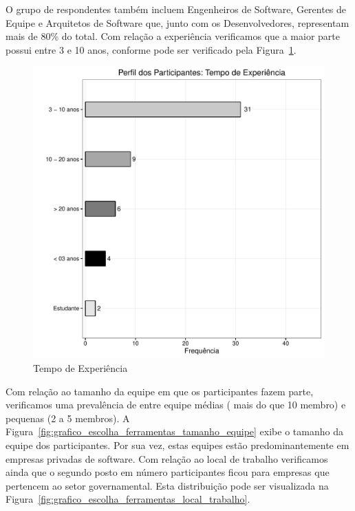 O grupo de respondentes também incluem Engenheiros de Software, Gerentes de
Equipe e Arquitetos de Software que, junto com os Desenvolvedores, representam
mais de 80\% do total. Com relação a experiência verificamos que a maior parte
possui entre 3 e 10 anos, conforme pode ser verificado pela
Figura~\ref{fig:grafico_escolha_ferramentas_tempo_experiencia}.

\begin{figure}[htpb]
	\centering
	\includegraphics[width=0.8\linewidth]{./chapter-caracterizacao-ferramentas/img/grafico_escolha_ferramentas_tempo_experiencia.pdf}
	\caption{Tempo de Experiência}
	\label{fig:grafico_escolha_ferramentas_tempo_experiencia}
\end{figure}

Com relação ao tamanho da equipe em que os participantes fazem parte,
verificamos uma prevalência de entre equipe médias ( mais do que 10 membro) e
pequenas (2 a 5 membros). A
Figura~\ref{fig:grafico_escolha_ferramentas_tamanho_equipe} exibe o tamanho da
equipe dos participantes. Por sua vez, estas equipes estão predominantemente em
empresas privadas de software. Com relação ao local de trabalho verificamos
ainda que o segundo posto em número participantes ficou para empresas que
pertencem ao setor governamental. Esta distribuição pode ser visualizada na
Figura~\ref{fig:grafico_escolha_ferramentas_local_trabalho}.

